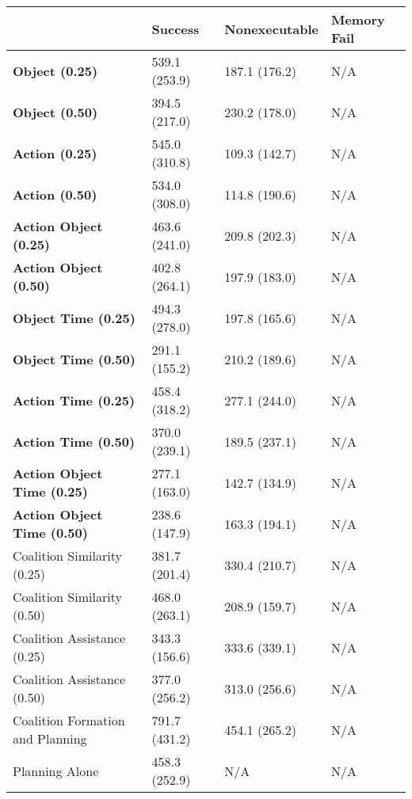 \begin{tabular}{llll}
\hline
                                    & Success       & Nonexecutable   & Memory Fail   \\
\hline
 \textbf{Object (0.25)}             & 539.1 (253.9) & 187.1 (176.2)   & N/A           \\
 \textbf{Object (0.50)}             & 394.5 (217.0) & 230.2 (178.0)   & N/A           \\
 \textbf{Action (0.25)}             & 545.0 (310.8) & 109.3 (142.7)   & N/A           \\
 \textbf{Action (0.50)}             & 534.0 (308.0) & 114.8 (190.6)   & N/A           \\
 \textbf{Action Object (0.25)}      & 463.6 (241.0) & 209.8 (202.3)   & N/A           \\
 \textbf{Action Object (0.50)}      & 402.8 (264.1) & 197.9 (183.0)   & N/A           \\
 \textbf{Object Time (0.25)}        & 494.3 (278.0) & 197.8 (165.6)   & N/A           \\
 \textbf{Object Time (0.50)}        & 291.1 (155.2) & 210.2 (189.6)   & N/A           \\
 \textbf{Action Time (0.25)}        & 458.4 (318.2) & 277.1 (244.0)   & N/A           \\
 \textbf{Action Time (0.50)}        & 370.0 (239.1) & 189.5 (237.1)   & N/A           \\
 \textbf{Action Object Time (0.25)} & 277.1 (163.0) & 142.7 (134.9)   & N/A           \\
 \textbf{Action Object Time (0.50)} & 238.6 (147.9) & 163.3 (194.1)   & N/A           \\
 Coalition Similarity (0.25)        & 381.7 (201.4) & 330.4 (210.7)   & N/A           \\
 Coalition Similarity (0.50)        & 468.0 (263.1) & 208.9 (159.7)   & N/A           \\
 Coalition Assistance (0.25)        & 343.3 (156.6) & 333.6 (339.1)   & N/A           \\
 Coalition Assistance (0.50)        & 377.0 (256.2) & 313.0 (256.6)   & N/A           \\
 Coalition Formation and Planning   & 791.7 (431.2) & 454.1 (265.2)   & N/A           \\
 Planning Alone                     & 458.3 (252.9) & N/A             & N/A           \\
\hline
\end{tabular}

